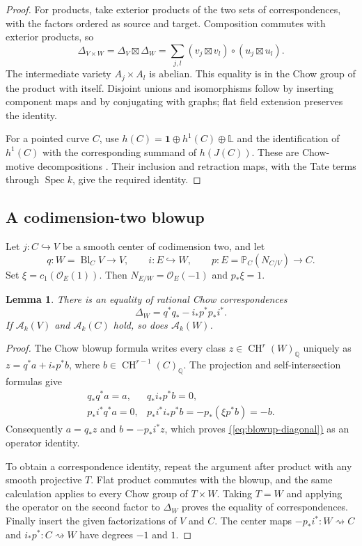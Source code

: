 \documentclass[11pt,a4paper]{article}
\newtheorem{lemma}[theorem]{Lemma}
\theoremstyle{definition}
\theoremstyle{remark}\newtheorem{remark}[theorem]{Remark}
\numberwithin{equation}{section}
\newcommand{\Q}{\mathbb Q}\newcommand{\R}{\mathbb R}\newcommand{\C}{\mathbb C}
\newcommand{\PP}{\mathbb P}\newcommand{\LL}{\mathbb L}
\newcommand{\CH}{\operatorname{CH}}\newcommand{\an}{\mathrm{an}}
\newcommand{\Spec}{\operatorname{Spec}}\newcommand{\Bl}{\operatorname{Bl}}
\renewcommand{\eqref}[1]{\hyperref[#1]{\textcolor{equationlink}{(\ref*{#1})}}}
\begin{document}
\begin{proof}
For products, take exterior products of the two sets of
correspondences, with the factors ordered as source and target.
Composition commutes with exterior products, so
\[
 \Delta_{V\times W}=\Delta_V\boxtimes\Delta_W
       =\sum_{j,l}(v_j\boxtimes v_l)\circ(u_j\boxtimes u_l).
\]
The intermediate variety $A_j\times A_l$ is abelian. This equality
is in the Chow group of the product with itself. Disjoint unions
and isomorphisms follow by inserting component maps and by conjugating
with graphs; flat field extension preserves the identity.

For a pointed curve $C$, use
$h(C)=\mathbf1\oplus h^1(C)\oplus\LL$ and the identification of
$h^1(C)$ with the corresponding summand of $h(J(C))$. These are
Chow-motive decompositions \cite[\S3.2, Proposition 4.5 and
Theorems 5.2--5.3]{Scholl}. Their inclusion and retraction maps,
with the Tate terms through $\Spec k$, give the required identity.
\end{proof}

\subsection{A codimension-two blowup}

Let $j:C\hookrightarrow V$ be a smooth center of codimension two,
and let
\[
 q:W=\Bl_CV\longrightarrow V,\qquad i:E\hookrightarrow W,
 \qquad p:E=\PP_C(N_{C/V})\longrightarrow C.
\]
Set $\xi=c_1(\mathcal O_E(1))$. Then $N_{E/W}=\mathcal O_E(-1)$
and $p_*\xi=1$.

\begin{lemma}\label{lem:blowup}
There is an equality of rational Chow correspondences
\begin{equation}\label{eq:blowup-diagonal}
        \Delta_W=q^*q_*-i_*p^*p_*i^*.
\end{equation}
If $\mathcal A_k(V)$ and $\mathcal A_k(C)$ hold, so does
$\mathcal A_k(W)$.
\end{lemma}

\begin{proof}
The Chow blowup formula \cite[\S6.7]{Fulton} writes every class
$z\in\CH^r(W)_\Q$ uniquely as
$z=q^*a+i_*p^*b$, where $b\in\CH^{r-1}(C)_\Q$. The projection
and self-intersection formulas give
\[
\begin{array}{ll}
 q_*q^*a=a,&q_*i_*p^*b=0,\\
 p_*i^*q^*a=0,&p_*i^*i_*p^*b=-p_*(\xi p^*b)=-b.
\end{array}
\]
Consequently $a=q_*z$ and $b=-p_*i^*z$, which proves
\eqref{eq:blowup-diagonal} as an operator identity.

To obtain a correspondence identity, repeat the argument after
product with any smooth projective $T$. Flat product commutes with
the blowup, and the same calculation applies to every Chow group
of $T\times W$. Taking $T=W$ and applying the operator on the
second factor to $\Delta_W$ proves the equality of correspondences.
Finally insert the given factorizations of $V$ and $C$. The center
maps $-p_*i^*:W\rightsquigarrow C$ and
$i_*p^*:C\rightsquigarrow W$ have degrees $-1$ and $1$.
\end{proof}
\end{document}

